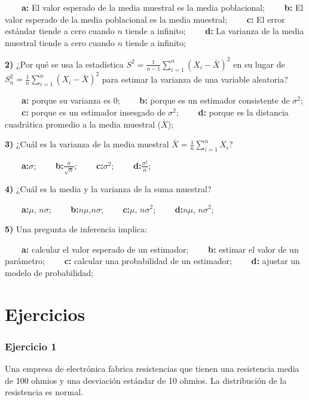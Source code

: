 \documentclass[
]{book}
\begin{document}
\textbf{\(\qquad\)a:} El valor esperado de la media muestral es la media poblacional;
\textbf{\(\qquad\)b:} El valor esperado de la media poblacional es la media muestral;
\textbf{\(\qquad\)c:} El error estándar tiende a cero cuando \(n\) tiende a infinito;
\textbf{\(\qquad\)d:} La varianza de la media muestral tiende a cero cuando \(n\) tiende a infinito;

\textbf{2)} ¿Por qué se usa la estadística \(S^2=\frac{1}{n-1}\sum_{i=1}^{n}(X_i -\bar{X})^2\) en su lugar de \(S_n^2=\frac{1}{n}\sum_{i=1}^{n}(X_i -\bar{X})^2\) para estimar la varianza de una variable aleatoria?

\textbf{\(\qquad\)a:} porque su varianza es \(0\);
\textbf{\(\qquad\)b:} porque es un estimador consistente de \(\sigma^2\);
\textbf{\(\qquad\)c:} porque es un estimador insesgado de \(\sigma^2\);
\textbf{\(\qquad\)d:} porque es la distancia cuadrática promedio a la media muestral (\(\bar{X}\));

\textbf{3)} ¿Cuál es la varianza de la media muestral \(\bar{X}=\frac{1}{n}\sum_{i=1}^n X_i\)?

\textbf{\(\qquad\)a:}\(\sigma\);
\textbf{\(\qquad\)b:}\(\frac{\sigma}{\sqrt{n}}\);
\textbf{\(\qquad\)c:}\(\sigma^2\);
\textbf{\(\qquad\)d:}\(\frac{\sigma^2}{n}\);

\textbf{4)} ¿Cuál es la media y la varianza de la suma muestral?

\textbf{\(\qquad\)a:}\(\mu\), \(n\sigma\);
\textbf{\(\qquad\)b:}\(n\mu\),\(n\sigma\);
\textbf{\(\qquad\)c:}\(\mu\), \(n\sigma^2\);
\textbf{\(\qquad\)d:}\(n\mu\), \(n\sigma^2\);

\textbf{5)} Una pregunta de inferencia implica:

\textbf{\(\qquad\)a:} calcular el valor esperado de un estimador;
\textbf{\(\qquad\)b:} estimar el valor de un parámetro;
\textbf{\(\qquad\)c:} calcular una probabilidad de un estimador;
\textbf{\(\qquad\)d:} ajustar un modelo de probabilidad;

\hypertarget{ejercicios-8}{%
\section{Ejercicios}\label{ejercicios-8}}

\hypertarget{ejercicio-1-7}{%
\subsubsection{Ejercicio 1}\label{ejercicio-1-7}}

Una empresa de electrónica fabrica resistencias que tienen una resistencia media de 100 ohmios y
una desviación estándar de 10 ohmios. La distribución de la resistencia es normal.
\end{document}
